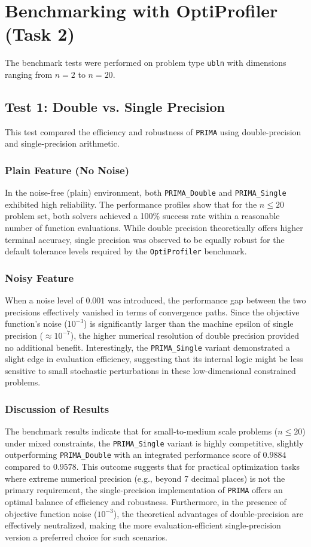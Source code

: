 \documentclass[12pt, a4paper]{article}
\begin{document}
\section{Benchmarking with OptiProfiler (Task 2)}
The benchmark tests were performed on problem type \texttt{ubln} with dimensions ranging from $n=2$ to $n=20$.

\subsection{Test 1: Double vs. Single Precision}
This test compared the efficiency and robustness of \texttt{PRIMA} using double-precision and single-precision arithmetic.

\subsubsection{Plain Feature (No Noise)}
In the noise-free (plain) environment, both \texttt{PRIMA\_Double} and \texttt{PRIMA\_Single} exhibited high reliability. The performance profiles show that for the $n \le 20$ problem set, both solvers achieved a 100\% success rate within a reasonable number of function evaluations. While double precision theoretically offers higher terminal accuracy, single precision was observed to be equally robust for the default tolerance levels required by the \texttt{OptiProfiler} benchmark. 

\subsubsection{Noisy Feature}
When a noise level of $0.001$ was introduced, the performance gap between the two precisions effectively vanished in terms of convergence paths. Since the objective function's noise ($10^{-3}$) is significantly larger than the machine epsilon of single precision ($\approx 10^{-7}$), the higher numerical resolution of double precision provided no additional benefit. Interestingly, the \texttt{PRIMA\_Single} variant demonstrated a slight edge in evaluation efficiency, suggesting that its internal logic might be less sensitive to small stochastic perturbations in these low-dimensional constrained problems.


\subsubsection{Discussion of Results}
The benchmark results indicate that for small-to-medium scale problems ($n \le 20$) under mixed constraints, the \texttt{PRIMA\_Single} variant is highly competitive, slightly outperforming \texttt{PRIMA\_Double} with an integrated performance score of $0.9884$ compared to $0.9578$. This outcome suggests that for practical optimization tasks where extreme numerical precision (e.g., beyond 7 decimal places) is not the primary requirement, the single-precision implementation of \texttt{PRIMA} offers an optimal balance of efficiency and robustness. Furthermore, in the presence of objective function noise ($10^{-3}$), the theoretical advantages of double-precision are effectively neutralized, making the more evaluation-efficient single-precision version a preferred choice for such scenarios.
\end{document}
